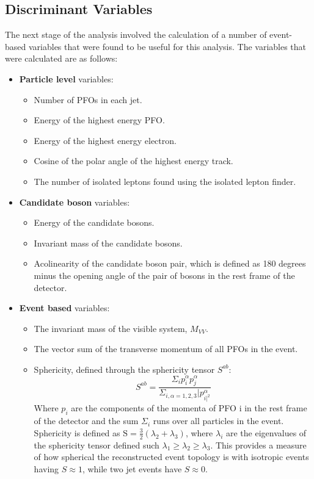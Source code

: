 \subsection{Discriminant Variables} 
\label{sec:analysisprocessor}
The next stage of the analysis involved the calculation of a number of event-based variables that were found to be useful for this analysis.  The variables that were calculated are as follows:

\begin{itemize}
\item \textbf{Particle level} variables:

\begin{itemize}
\item Number of PFOs in each jet.
\item Energy of the highest energy PFO.
\item Energy of the highest energy electron.
\item Cosine of the polar angle of the highest energy track.
\item The number of isolated leptons found using the isolated lepton finder.
\end{itemize}

\item \textbf{Candidate boson} variables:

\begin{itemize}
\item Energy of the candidate bosons.
\item Invariant mass of the candidate bosons.
\item Acolinearity of the candidate boson pair, which is defined as 180 degrees minus the opening angle of the pair of bosons in the rest frame of the detector.
\end{itemize}

\item \textbf{Event based} variables:  

\begin{itemize}
\item The invariant mass of the visible system, $M_{VV}$.
\item The vector sum of the transverse momentum of all PFOs in the event. 
\item Sphericity, defined through the sphericity tensor $S^{ab}$:
\begin{equation}
S^{ab} = \frac{\Sigma_{i}p^{\alpha}_{i}p^{\alpha}_{j}}{\Sigma_{i,\alpha=1,2,3}|p^{\alpha}_{i|^{2}}}
\end{equation}
Where $p_{i}$ are the components of the momenta of PFO i in the rest frame of the detector and the sum $\Sigma_{i}$ runs over all particles in the event.  Sphericity is defined as $\text{S} = \frac{3}{2}(\lambda_{2} + \lambda_{3})$, where $\lambda_{i}$ are the eigenvalues of the sphericity tensor defined such $\lambda_{1} \geq \lambda_{2} \geq \lambda_{3}$.  This provides a measure of how spherical the reconstructed event topology is with isotropic events having $S \approx 1$, while two jet events have $S \approx 0$.
\end{itemize}


\end{itemize}
